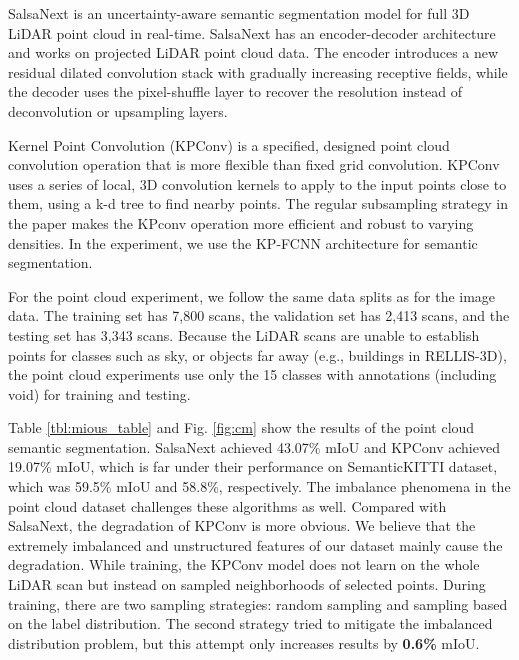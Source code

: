 \documentclass[letterpaper, 10 pt, conference]{ieeeconf}
\begin{document}
SalsaNext is an uncertainty-aware semantic segmentation model for full 3D LiDAR point cloud in real-time. SalsaNext has an encoder-decoder architecture and works on projected LiDAR point cloud data. The encoder introduces a new residual dilated convolution stack with gradually increasing receptive fields, while the decoder uses the pixel-shuffle layer to recover the resolution instead of deconvolution or upsampling layers.

Kernel Point Convolution (KPConv) is a specified, designed point cloud convolution operation that is more flexible than fixed grid convolution. KPConv uses a series of local, 3D convolution kernels to apply to the input points close to them, using a k-d tree to find nearby points. The regular subsampling strategy in the paper makes the KPconv operation more efficient and robust to varying densities. In the experiment, we use the KP-FCNN architecture \cite{Thomas2019} for semantic segmentation.

For the point cloud experiment, we follow the same data splits as for the image data. The training set has 7,800 scans, the validation set has 2,413 scans, and the testing set has 3,343 scans. Because the LiDAR scans are unable to establish points for classes such as sky, or objects far away (e.g., buildings in RELLIS-3D), the point cloud experiments use only the 15 classes with annotations (including void) for training and testing. 


Table \ref{tbl:mious_table} and Fig. \ref{fig:cm} show the results of the point cloud semantic segmentation. SalsaNext achieved 43.07\% mIoU and KPConv achieved 19.07\% mIoU, which is far under their performance on SemanticKITTI dataset, which was 59.5\% mIoU and 58.8\%, respectively. The imbalance phenomena in the point cloud dataset challenges these algorithms as well.
Compared with SalsaNext, the degradation of KPConv is more obvious. We believe that the extremely imbalanced and unstructured features of our dataset mainly cause the degradation. While training, the KPConv model does not learn on the whole LiDAR scan but instead on sampled neighborhoods of selected points. During training, there are two sampling strategies: random sampling and sampling based on the label distribution. The second strategy tried to mitigate the imbalanced distribution problem, but this attempt only increases results by \textbf{0.6\%} mIoU.
\end{document}
